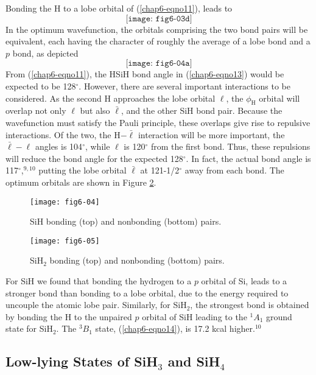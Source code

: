 Bonding the H to a lobe orbital of (\ref{chap6-eqno11}), leads to
\begin{equation}
\texttt{[image: fig6-03d]}
\label{chap6-eqno13}
\end{equation}
In the optimum wavefunction, the orbitals comprising the two bond 
pairs will be equivalent, each having the character of roughly the 
average of a lobe bond and a $p$ bond, as depicted
\begin{equation}
\texttt{[image: fig6-04a]}
\label{chap6-eqno14}
\end{equation}
From (\ref{chap6-eqno11}), the HSiH bond angle in (\ref{chap6-eqno13})
would be expected to be 128$^{\circ}$.  However, there are several
important interactions to be considered.  As the second H approaches
the lobe orbital $\ell$, the $\phi_\mathrm{H}$ orbital will overlap not only
$\ell$ but also $\bar{\ell}$, and the other SiH bond pair.  Because
the wavefunction must satisfy the Pauli principle, these overlaps give
rise to repulsive interactions.  Of the two, the H$-{\bar{\ell}}$
interaction will be more important, the $\bar{\ell}-\ell$ angles is
104$^{\circ}$, while $\ell$ is 120$^{\circ}$ from the first bond.
Thus, these repulsions will reduce the bond angle for the expected
128$^{\circ}$.  In fact, the actual bond angle is
117$^{\circ}$,$^{9,10}$ putting the lobe orbital $\bar{\ell}$ at
121-1/2$^{\circ}$ away from each bond.  The optimum orbitals are shown
in Figure \ref{chap6-fig5}.

\begin{figure}
\texttt{[image: fig6-04]}
\caption{SiH bonding (top) and nonbonding (bottom) pairs.}
\label{chap6-fig4}
\end{figure}

\begin{figure}
\texttt{[image: fig6-05]}
\caption{SiH$_2$ bonding (top) and nonbonding (bottom) pairs.}
\label{chap6-fig5}
\end{figure}

For SiH we found that bonding the hydrogen to a $p$ orbital of Si,
leads to a stronger bond than bonding to a lobe orbital, due to the
energy required to uncouple the atomic lobe pair.  Similarly, for
SiH$_2$, the strongest bond is obtained by bonding the H to the
unpaired $p$ orbital of SiH leading to the ${^1A}_1$ ground state for
SiH$_2$.  The ${^3B}_1$ state, (\ref{chap6-eqno14}), is 17.2 kcal
higher.$^{10}$

\subsection{Low-lying States of SiH$_3$ and SiH$_4$}

